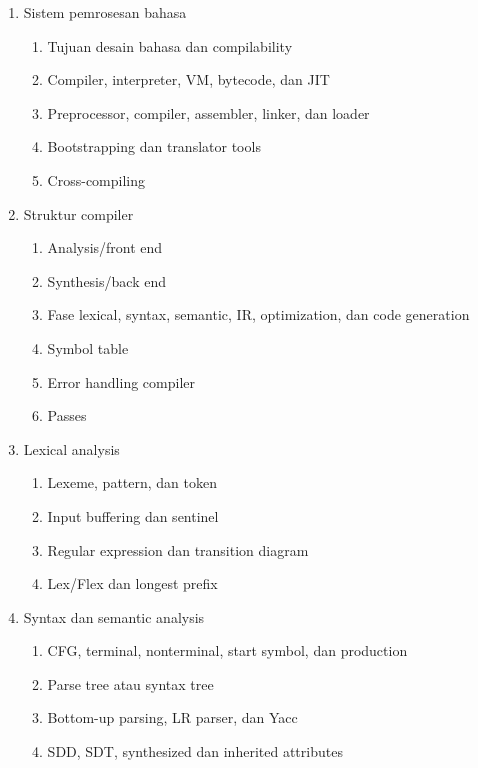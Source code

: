 \begin{enumerate}
    \item \pwajib Sistem pemrosesan bahasa
    \begin{enumerate}
        \item \ppaham Tujuan desain bahasa dan compilability
        \item \pwajib Compiler, interpreter, VM, bytecode, dan JIT
        \item \ppaham Preprocessor, compiler, assembler, linker, dan loader
        \item \ppaham Bootstrapping dan translator tools
        \item \ppaham Cross-compiling
    \end{enumerate}
    \item \pwajib Struktur compiler
    \begin{enumerate}
        \item \pwajib Analysis/front end
        \item \pwajib Synthesis/back end
        \item \pwajib Fase lexical, syntax, semantic, IR, optimization, dan code generation
        \item \pwajib Symbol table
        \item \pwajib Error handling compiler
        \item \ppaham Passes
    \end{enumerate}
    \item \pwajib Lexical analysis
    \begin{enumerate}
        \item \pwajib Lexeme, pattern, dan token
        \item \ppaham Input buffering dan sentinel
        \item \pwajib Regular expression dan transition diagram
        \item \ppaham Lex/Flex dan longest prefix
    \end{enumerate}
    \item \pwajib Syntax dan semantic analysis
    \begin{enumerate}
        \item \pwajib CFG, terminal, nonterminal, start symbol, dan production
        \item \pwajib Parse tree atau syntax tree
        \item \ppaham Bottom-up parsing, LR parser, dan Yacc
        \item \pwajib SDD, SDT, synthesized dan inherited attributes

\end{enumerate}
\end{enumerate}
